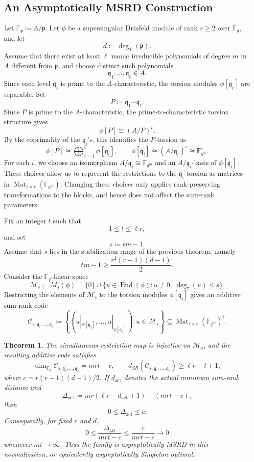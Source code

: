 \documentclass[10pt,a4paper]{amsart}
\DeclareMathOperator{\End}{End}
\DeclareMathOperator{\Mat}{Mat}
\theoremstyle{definition}
\theoremstyle{plain}
\newtheorem{theorem}[definition]{Theorem}
\theoremstyle{remark}
\newcommand{\vF}{\mathbb F}
\newcommand{\p}{\mathfrak p}
\begin{document}
\subsection{An Asymptotically MSRD Construction}

Let $\vF_{\p}\coloneqq A/\p$.  Let $\phi$ be a supersingular Drinfeld module
of rank $r\geq 2$ over $\overline{\vF}_{\p}$, and let
$$
d\coloneqq \deg_T(\p).
$$
Assume that there exist at least $\ell$ monic irreducible polynomials of degree $m$ in $A$ different from $\p$, and choose distinct such polynomials
$$
\mathfrak q_1,\ldots,\mathfrak q_\ell\in A.
$$
Since each level $\mathfrak q_i$ is prime to the $A$-characteristic, the torsion modules $\phi[\mathfrak q_i]$ are separable. Set
$$
P\coloneqq \mathfrak q_1\cdots \mathfrak q_\ell.
$$
Since $P$ is prime to the $A$-characteristic, the prime-to-characteristic torsion structure gives
$$
\phi[P]\cong (A/P)^r.
$$
By the coprimality of the $\mathfrak q_i$'s, this identifies the $P$-torsion as
$$
\phi[P]\cong \bigoplus_{i=1}^{\ell}\phi[\mathfrak q_i],
\qquad
\phi[\mathfrak q_i]\cong (A/\mathfrak q_i)^r\cong \vF_{q^m}^r.
$$
For each $i$, we choose an isomorphism $A/\mathfrak q_i\cong \vF_{q^m}$ and an $A/\mathfrak q_i$-basis of $\phi[\mathfrak q_i]$. These choices allow us to represent the restrictions to the $\mathfrak q_i$-torsion as matrices in $\Mat_{r\times r}(\vF_{q^m})$. Changing these choices only applies rank-preserving transformations to the blocks, and hence does not affect the sum-rank parameters.

Fix an integer $t$ such that
$$
1\leq t\leq \ell r,
$$
and set
$$
s\coloneqq tm-1.
$$
Assume that $s$ lies in the stabilization range of the previous theorem, namely
$$
tm-1\geq \frac{r^2(r-1)(d-1)}{2}.
$$
Consider the $\vF_q$-linear space
$$
\mathcal M_s\coloneqq M_s(\phi)
=
\{0\}\cup\{u\in \End(\phi):u\neq 0,\ \deg_\tau(u)\leq s\}.
$$
Restricting the elements of $\mathcal M_s$ to the torsion modules $\phi[\mathfrak q_i]$ gives an additive sum-rank code
$$
\mathcal C_{s,\mathfrak q_1,\ldots,\mathfrak q_\ell}
\coloneqq
\left\{
\left(
u|_{\phi[\mathfrak q_1]},\ldots,u|_{\phi[\mathfrak q_\ell]}
\right)
:
u\in\mathcal M_s
\right\}
\subseteq
\Mat_{r\times r}(\vF_{q^m})^\ell.
$$

\begin{theorem}
The simultaneous restriction map is injective on $\mathcal M_s$, and the
resulting additive code satisfies
$$
\dim_{\vF_q}\mathcal C_{s,\mathfrak q_1,\ldots,\mathfrak q_\ell}
=mrt-c,
\qquad
d_{SR}(\mathcal C_{s,\mathfrak q_1,\ldots,\mathfrak q_\ell})
\geq\ell r-t+1,
$$
where $c=r(r-1)(d-1)/2$. If $d_{\mathrm{act}}$ denotes the actual minimum
sum-rank distance and
$$
\Delta_{\mathrm{act}}
\coloneqq
mr(\ell r-d_{\mathrm{act}}+1)-(mrt-c),
$$
then
$$
0\leq\Delta_{\mathrm{act}}\leq c.
$$
Consequently, for fixed $r$ and $d$,
$$
0\leq
\frac{\Delta_{\mathrm{act}}}{mrt-c}
\leq
\frac{c}{mrt-c}
\longrightarrow0
$$
whenever $mt\to\infty$. Thus the family is asymptotically MSRD in this
normalization, or equivalently asymptotically Singleton-optimal.
\end{theorem}
\end{document}
